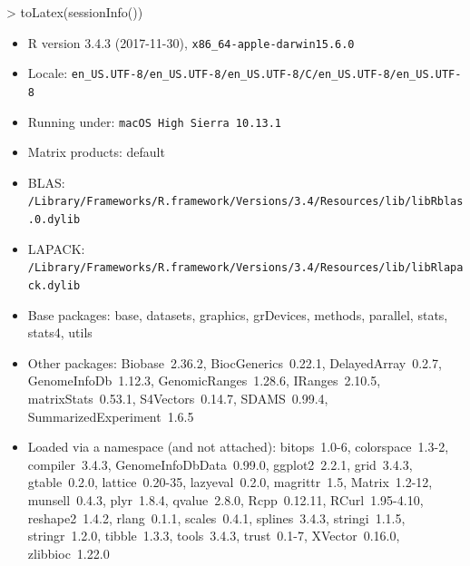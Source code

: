 \documentclass[12pt]{article}
\begin{document}
\begin{Schunk}
\begin{Sinput}
> toLatex(sessionInfo())
\end{Sinput}
\begin{itemize}\raggedright
  \item R version 3.4.3 (2017-11-30), \verb|x86_64-apple-darwin15.6.0|
  \item Locale: \verb|en_US.UTF-8/en_US.UTF-8/en_US.UTF-8/C/en_US.UTF-8/en_US.UTF-8|
  \item Running under: \verb|macOS High Sierra 10.13.1|
  \item Matrix products: default
  \item BLAS: \verb|/Library/Frameworks/R.framework/Versions/3.4/Resources/lib/libRblas.0.dylib|
  \item LAPACK: \verb|/Library/Frameworks/R.framework/Versions/3.4/Resources/lib/libRlapack.dylib|
  \item Base packages: base, datasets, graphics, grDevices, methods,
    parallel, stats, stats4, utils
  \item Other packages: Biobase~2.36.2, BiocGenerics~0.22.1,
    DelayedArray~0.2.7, GenomeInfoDb~1.12.3, GenomicRanges~1.28.6,
    IRanges~2.10.5, matrixStats~0.53.1, S4Vectors~0.14.7, SDAMS~0.99.4,
    SummarizedExperiment~1.6.5
  \item Loaded via a namespace (and not attached): bitops~1.0-6,
    colorspace~1.3-2, compiler~3.4.3, GenomeInfoDbData~0.99.0,
    ggplot2~2.2.1, grid~3.4.3, gtable~0.2.0, lattice~0.20-35,
    lazyeval~0.2.0, magrittr~1.5, Matrix~1.2-12, munsell~0.4.3,
    plyr~1.8.4, qvalue~2.8.0, Rcpp~0.12.11, RCurl~1.95-4.10,
    reshape2~1.4.2, rlang~0.1.1, scales~0.4.1, splines~3.4.3,
    stringi~1.1.5, stringr~1.2.0, tibble~1.3.3, tools~3.4.3,
    trust~0.1-7, XVector~0.16.0, zlibbioc~1.22.0
\end{itemize}\end{Schunk}



\end{document}
